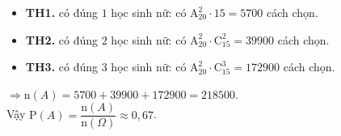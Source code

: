 \begin{ex}
{\begin{itemchoice}
\begin{itemize}
				\item \textbf{TH1.} có đúng $1$  học sinh nữ: có $\mathrm{A}_{20}^2 \cdot 15=5700$ cách chọn.
				\item \textbf{TH2.} có đúng $2$  học sinh nữ: có $\mathrm{A}_{20}^2 \cdot \mathrm{C}_{15}^2=39900$ cách chọn.
				\item \textbf{TH3.} có đúng $3$ học sinh nữ: có $\mathrm{A}_{20}^2 \cdot \mathrm{C}_{15}^3=172900$  cách chọn.
			\end{itemize}
			$ \Rightarrow \mathrm{n}(A) =5700+39900+172900=218500$.\\ 
			Vậy $\mathrm{P}(A)  = \dfrac{\mathrm{n} (A)}{\mathrm{n}(\Omega)}\approx 0{,}67$.
		\end{itemchoice}
	 }
\end{ex}

